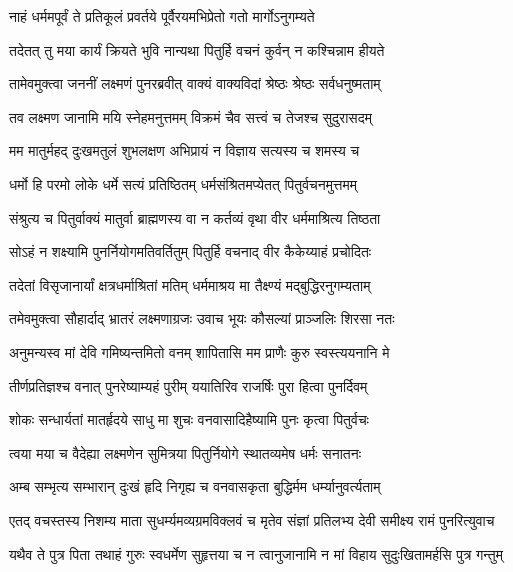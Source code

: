 \twolineshloka
{नाहं धर्ममपूर्वं ते प्रतिकूलं प्रवर्तये}
{पूर्वैरयमभिप्रेतो गतो मार्गोऽनुगम्यते} %

\twolineshloka
{तदेतत् तु मया कार्यं क्रियते भुवि नान्यथा}
{पितुर्हि वचनं कुर्वन् न कश्चिन्नाम हीयते} %

\twolineshloka
{तामेवमुक्त्वा जननीं लक्ष्मणं पुनरब्रवीत्}
{वाक्यं वाक्यविदां श्रेष्ठः श्रेष्ठः सर्वधनुष्मताम्} %

\twolineshloka
{तव लक्ष्मण जानामि मयि स्नेहमनुत्तमम्}
{विक्रमं चैव सत्त्वं च तेजश्च सुदुरासदम्} %

\twolineshloka
{मम मातुर्महद् दुःखमतुलं शुभलक्षण}
{अभिप्रायं न विज्ञाय सत्यस्य च शमस्य च} %

\twolineshloka
{धर्मो हि परमो लोके धर्मे सत्यं प्रतिष्ठितम्}
{धर्मसंश्रितमप्येतत् पितुर्वचनमुत्तमम्} %

\twolineshloka
{संश्रुत्य च पितुर्वाक्यं मातुर्वा ब्राह्मणस्य वा}
{न कर्तव्यं वृथा वीर धर्ममाश्रित्य तिष्ठता} %

\twolineshloka
{सोऽहं न शक्ष्यामि पुनर्नियोगमतिवर्तितुम्}
{पितुर्हि वचनाद् वीर कैकेय्याहं प्रचोदितः} %

\twolineshloka
{तदेतां विसृजानार्यां क्षत्रधर्माश्रितां मतिम्}
{धर्ममाश्रय मा तैक्ष्ण्यं मद्बुद्धिरनुगम्यताम्} %

\twolineshloka
{तमेवमुक्त्वा सौहार्दाद् भ्रातरं लक्ष्मणाग्रजः}
{उवाच भूयः कौसल्यां प्राञ्जलिः शिरसा नतः} %

\twolineshloka
{अनुमन्यस्व मां देवि गमिष्यन्तमितो वनम्}
{शापितासि मम प्राणैः कुरु स्वस्त्ययनानि मे} %

\twolineshloka
{तीर्णप्रतिज्ञश्च वनात् पुनरेष्याम्यहं पुरीम्}
{ययातिरिव राजर्षिः पुरा हित्वा पुनर्दिवम्} %

\twolineshloka
{शोकः सन्धार्यतां मातर्हृदये साधु मा शुचः}
{वनवासादिहैष्यामि पुनः कृत्वा पितुर्वचः} %

\twolineshloka
{त्वया मया च वैदेह्या लक्ष्मणेन सुमित्रया}
{पितुर्नियोगे स्थातव्यमेष धर्मः सनातनः} %

\twolineshloka
{अम्ब सम्भृत्य सम्भारान् दुःखं हृदि निगृह्य च}
{वनवासकृता बुद्धिर्मम धर्म्यानुवर्त्यताम्} %

\twolineshloka
{एतद् वचस्तस्य निशम्य माता सुधर्म्यमव्यग्रमविक्लवं च}
{मृतेव संज्ञां प्रतिलभ्य देवी समीक्ष्य रामं पुनरित्युवाच} %

\twolineshloka
{यथैव ते पुत्र पिता तथाहं गुरुः स्वधर्मेण सुहृत्तया च}
{न त्वानुजानामि न मां विहाय सुदुःखितामर्हसि पुत्र गन्तुम्} %

